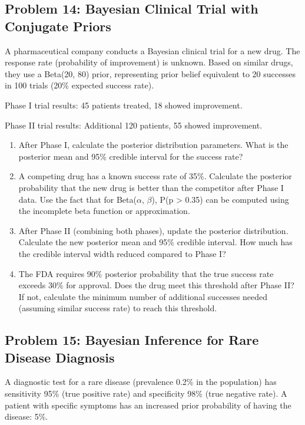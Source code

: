 \documentclass[12pt]{article}
\begin{document}
\subsection*{Problem 14: Bayesian Clinical Trial with Conjugate Priors}

A pharmaceutical company conducts a Bayesian clinical trial for a new drug. The response rate (probability of improvement) is unknown. Based on similar drugs, they use a Beta(20, 80) prior, representing prior belief equivalent to 20 successes in 100 trials (20\% expected success rate).

Phase I trial results: 45 patients treated, 18 showed improvement.

Phase II trial results: Additional 120 patients, 55 showed improvement.

\begin{enumerate}[label=(\alph*)]
\item After Phase I, calculate the posterior distribution parameters. What is the posterior mean and 95\% credible interval for the success rate?

\item A competing drug has a known success rate of 35\%. Calculate the posterior probability that the new drug is better than the competitor after Phase I data. Use the fact that for Beta(\(\alpha\), \(\beta\)), P(p > 0.35) can be computed using the incomplete beta function or approximation.

\item After Phase II (combining both phases), update the posterior distribution. Calculate the new posterior mean and 95\% credible interval. How much has the credible interval width reduced compared to Phase I?

\item The FDA requires 90\% posterior probability that the true success rate exceeds 30\% for approval. Does the drug meet this threshold after Phase II? If not, calculate the minimum number of additional successes needed (assuming similar success rate) to reach this threshold.
\end{enumerate}

\subsection*{Problem 15: Bayesian Inference for Rare Disease Diagnosis}

A diagnostic test for a rare disease (prevalence 0.2\% in the population) has sensitivity 95\% (true positive rate) and specificity 98\% (true negative rate). A patient with specific symptoms has an increased prior probability of having the disease: 5\%.
\end{document}
